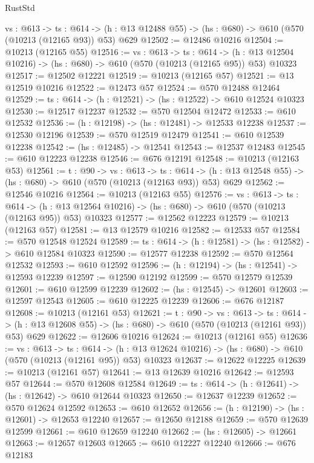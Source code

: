 \begin{lexlean}{RustStd}
\begin{coremodule}
  {vs : @613} ->
  {ts : @614} -> (h : @13 @12488 @55) -> (hs : @680) -> @610 (@570 (@10213 (@12165 @93)) @53) @629
@12502 := @12486 @10216
@12504 := @10213 (@12165 @55)
@12516 := {vs : @613} ->
  {ts : @614} ->
  (h : @13 @12504 @10216) -> (hs : @680) -> @610 (@570 (@10213 (@12165 @95)) @53) @10323
@12517 := @12502 @12221
@12519 := @10213 (@12165 @57)
@12521 := @13 @12519 @10216
@12522 := @12473 @57
@12524 := @570 @12488 @12464
@12529 := {ts : @614} -> (h : @12521) -> (hs : @12522) -> @610 @12524 @10323
@12530 := @12517 @12237
@12532 := @570 @12504 @12472
@12533 := @610 @12532
@12536 := (h : @12198) -> (hs : @12481) -> @12533 @12238
@12537 := @12530 @12196
@12539 := @570 @12519 @12479
@12541 := @610 @12539 @12238
@12542 := (hs : @12485) -> @12541
@12543 := @12537 @12483
@12545 := @610 @12223 @12238
@12546 := @676 @12191
@12548 := @10213 (@12163 @53)
@12561 := {t : @90} ->
  {vs : @613} ->
  {ts : @614} -> (h : @13 @12548 @55) -> (hs : @680) -> @610 (@570 (@10213 (@12163 @93)) @53) @629
@12562 := @12546 @10216
@12564 := @10213 (@12163 @55)
@12576 := {vs : @613} ->
  {ts : @614} ->
  (h : @13 @12564 @10216) -> (hs : @680) -> @610 (@570 (@10213 (@12163 @95)) @53) @10323
@12577 := @12562 @12223
@12579 := @10213 (@12163 @57)
@12581 := @13 @12579 @10216
@12582 := @12533 @57
@12584 := @570 @12548 @12524
@12589 := {ts : @614} -> (h : @12581) -> (hs : @12582) -> @610 @12584 @10323
@12590 := @12577 @12238
@12592 := @570 @12564 @12532
@12593 := @610 @12592
@12596 := (h : @12194) -> (hs : @12541) -> @12593 @12239
@12597 := @12590 @12192
@12599 := @570 @12579 @12539
@12601 := @610 @12599 @12239
@12602 := (hs : @12545) -> @12601
@12603 := @12597 @12543
@12605 := @610 @12225 @12239
@12606 := @676 @12187
@12608 := @10213 (@12161 @53)
@12621 := {t : @90} ->
  {vs : @613} ->
  {ts : @614} -> (h : @13 @12608 @55) -> (hs : @680) -> @610 (@570 (@10213 (@12161 @93)) @53) @629
@12622 := @12606 @10216
@12624 := @10213 (@12161 @55)
@12636 := {vs : @613} ->
  {ts : @614} ->
  (h : @13 @12624 @10216) -> (hs : @680) -> @610 (@570 (@10213 (@12161 @95)) @53) @10323
@12637 := @12622 @12225
@12639 := @10213 (@12161 @57)
@12641 := @13 @12639 @10216
@12642 := @12593 @57
@12644 := @570 @12608 @12584
@12649 := {ts : @614} -> (h : @12641) -> (hs : @12642) -> @610 @12644 @10323
@12650 := @12637 @12239
@12652 := @570 @12624 @12592
@12653 := @610 @12652
@12656 := (h : @12190) -> (hs : @12601) -> @12653 @12240
@12657 := @12650 @12188
@12659 := @570 @12639 @12599
@12661 := @610 @12659 @12240
@12662 := (hs : @12605) -> @12661
@12663 := @12657 @12603
@12665 := @610 @12227 @12240
@12666 := @676 @12183

\end{coremodule}
\end{lexlean}
